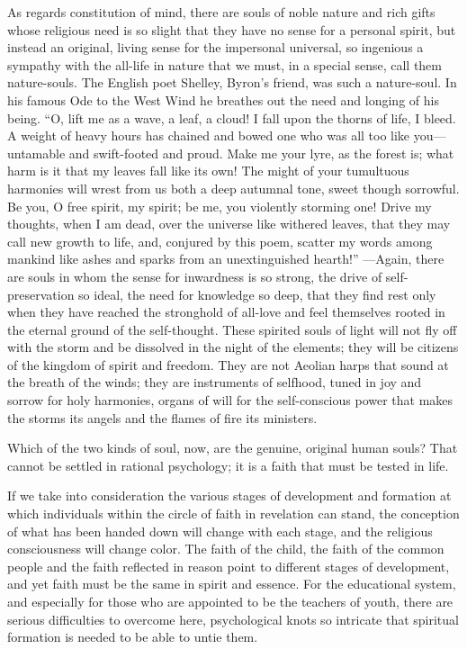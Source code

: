 \documentclass[12pt,a4paper,openany]{book}
\newcommand{\opage}[1]{\marginnote{\footnotesize\textit{[#1]}}}
\begin{document}
As regards constitution of mind, there are souls of noble nature and
rich gifts whose religious need is so slight that they have no sense for
a personal spirit, but instead an original, living sense for the
impersonal universal, so ingenious a sympathy with the all-life in
nature that we must, in a special sense, call them \opage{41}nature-souls. The
English poet Shelley, Byron's friend, was such a nature-soul. In his
famous Ode to the West Wind he breathes out the need and longing of his
being. ``O, lift me as a wave, a leaf, a cloud! I fall upon the thorns of
life, I bleed. A weight of heavy hours has chained and bowed one who was
all too like you---untamable and swift-footed and proud. Make me your
lyre, as the forest is; what harm is it that my leaves fall like its
own! The might of your tumultuous harmonies will wrest from us both a
deep autumnal tone, sweet though sorrowful. Be you, O free spirit, my
spirit; be me, you violently storming one! Drive my thoughts, when I am
dead, over the universe like withered leaves, that they may call new
growth to life, and, conjured by this poem, scatter my words among
mankind like ashes and sparks from an unextinguished hearth!'' %
---Again, there are souls in whom the sense for inwardness is so strong,
the drive of self-preservation so ideal, the need for knowledge so deep,
that they find rest only when they have reached the stronghold of
all-love and feel themselves rooted in the eternal ground of the
self-thought. These spirited souls of light will not fly off with the
storm and be dissolved in the night of the elements; they will be
citizens of the kingdom of spirit and freedom. They are not Aeolian
harps that sound at the breath of the winds; they are instruments of
selfhood, tuned in joy and sorrow for holy harmonies, organs of will for
the self-conscious power that makes the storms its angels and the flames
of fire its ministers.

Which of the two kinds of soul, now, are the genuine, original human
souls? That cannot be settled in rational psychology; it is a faith that
must be tested in life.

If we take into consideration the various stages of development and
\opage{42}formation at which individuals within the circle of faith in revelation
can stand, the conception of what has been handed down will change with
each stage, and the religious consciousness will change color. The faith
of the child, the faith of the common people and the faith reflected in
reason point to different stages of development, and yet faith must be
the same in spirit and essence. For the educational system, and
especially for those who are appointed to be the teachers of youth, there
are serious difficulties to overcome here, psychological knots so
intricate that spiritual formation is needed to be able to untie them.
\end{document}
